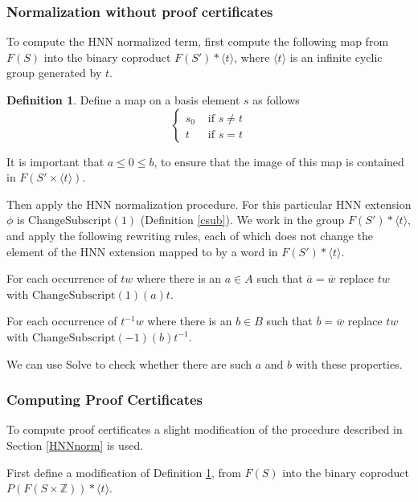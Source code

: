 \documentclass[12pt]{article} %
\theoremstyle{definition}
\theoremstyle{definition}
\theoremstyle{definition}
\theoremstyle{definition}
\theoremstyle{definition}
\newtheorem{defn}[theorem]{Definition}
\theoremstyle{definition}
\begin{document}
\subsubsection{Normalization without proof certificates}\label{HNNnormnoproof}

To compute the HNN normalized term,
first compute the following map from $F(S)$ into the binary
coproduct $F(S') \ast \langle t \rangle$, where $\langle t \rangle$ is an infinite
cyclic group generated by $t$.

\begin{defn}\label{tocoprod}
  Define a map on a basis element $s$ as follows
  \begin{equation}
    \begin{cases}
      s_0 & \text{ if } s \ne t \\
      t & \text{ if } s = t
    \end{cases}
  \end{equation}
\end{defn}

It is important that $a \le 0 \le b$, to ensure that the image
of this map is contained in $F(S' \times \langle t \rangle)$.

Then apply the HNN normalization procedure. For this particular HNN extension
$\phi$ is $\text{ChangeSubscript}(1)$ (Definition \ref{csub}).
We work in the group $F(S') \ast \langle t \rangle$, and apply the following
rewriting rules, each of which does not change the element of the HNN extension
mapped to by a word in $F(S') \ast \langle t \rangle$.

For each occurrence of $tw$ where there is an $a \in A$ such that
$\overline{a} = \overline{w}$ replace $tw$ with $\text{ChangeSubscript}(1)(a)t$.

For each occurrence of $t^{-1}w$ where there is an $b \in B$ such that
$\overline{b} = \overline{w}$ replace $tw$ with $\text{ChangeSubscript}(-1)(b)t^{-1}$.

We can use Solve to check whether there are such $a$ and $b$ with
these properties.

\subsubsection{Computing Proof Certificates}\label{HNNPC}

To compute proof certificates a slight modification of the procedure described in Section
\ref{HNNnorm} is used.

First define a modification of Definition \ref{tocoprod}, from $F(S)$ into the binary
coproduct $P(F(S \times \mathbb{Z})) \ast \langle t \rangle$.
\end{document}
